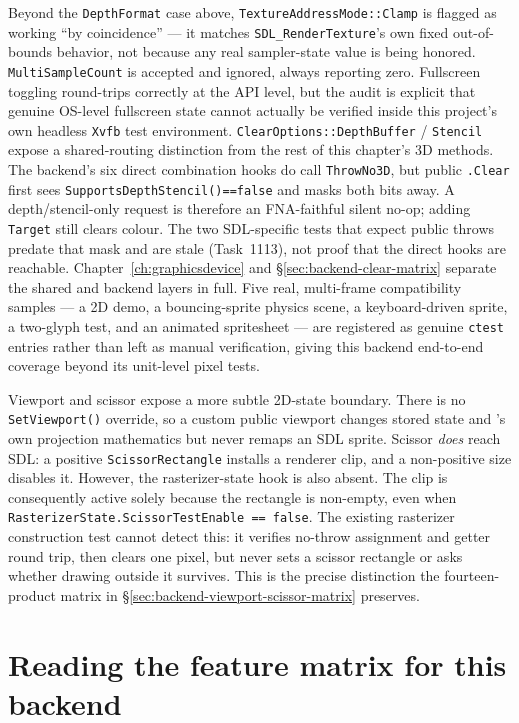 Beyond the \texttt{DepthFormat} case above, \texttt{TextureAddressMode::Clamp} is flagged as
working ``by coincidence'' --- it matches \texttt{SDL\_RenderTexture}'s own fixed
out-of-bounds behavior, not because any real sampler-state value is being honored.
\texttt{MultiSampleCount} is accepted and ignored, always reporting zero. Fullscreen
toggling round-trips correctly at the API level, but the audit is explicit that genuine
OS-level fullscreen state cannot actually be verified inside this project's own headless
\texttt{Xvfb} test environment. \texttt{ClearOptions::DepthBuffer} / \texttt{Stencil} expose
a shared-routing distinction from the rest of this chapter's 3D methods. The backend's six
direct combination hooks do call \texttt{ThrowNo3D}, but public
\texttt{.Clear} first sees \texttt{SupportsDepthStencil()==false} and masks
both bits away. A depth/stencil-only request is therefore an FNA-faithful silent no-op; adding
\texttt{Target} still clears colour. The two SDL-specific tests that expect public throws
predate that mask and are stale (Task~1113), not proof that the direct hooks are reachable.
Chapter~\ref{ch:graphicsdevice} and \S\ref{sec:backend-clear-matrix} separate the shared and
backend layers in full. Five real, multi-frame compatibility samples --- a 2D
demo, a bouncing-sprite physics scene, a keyboard-driven sprite, a two-glyph
 test, and an animated spritesheet --- are registered as genuine
\texttt{ctest} entries rather than left as manual verification, giving this backend
end-to-end coverage beyond its unit-level pixel tests.

Viewport and scissor expose a more subtle 2D-state boundary. There is no
\texttt{SetViewport()} override, so a custom public viewport changes stored state and
's own projection mathematics but never remaps an SDL sprite. Scissor
\emph{does} reach SDL: a positive \texttt{ScissorRectangle} installs a renderer clip, and a
non-positive size disables it. However, the rasterizer-state hook is also absent. The clip is
consequently active solely because
the rectangle is non-empty, even when
\texttt{RasterizerState.ScissorTestEnable == false}. The existing rasterizer construction test
cannot detect this: it verifies no-throw assignment and getter round trip, then clears one
pixel, but never sets a scissor rectangle or asks whether drawing outside it survives. This is
the precise distinction the fourteen-product matrix in
\S\ref{sec:backend-viewport-scissor-matrix} preserves.

\section{Reading the feature matrix for this backend}

